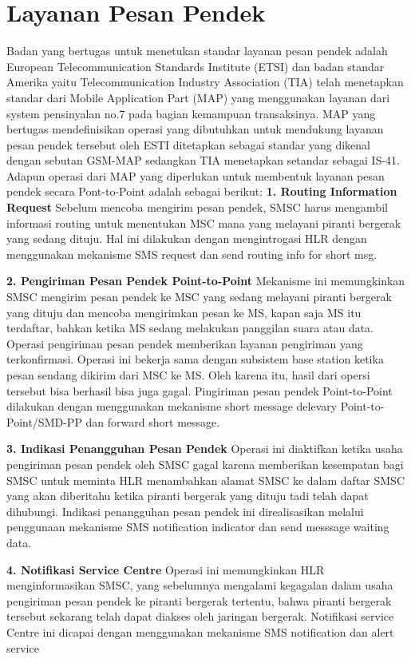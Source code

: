 \documentclass{jtetiproposalskripsi}
\begin{document}
\section{Layanan Pesan Pendek}
Badan yang bertugas untuk menetukan standar layanan pesan pendek adalah European Telecommunication Standards Institute (ETSI) dan badan standar Amerika yaitu Telecommunication Industry Association (TIA) telah menetapkan standar dari Mobile Application Part (MAP) yang menggunakan layanan dari system pensinyalan no.7 pada bagian kemampuan transaksinya. MAP yang bertugas mendefinisikan operasi yang dibutuhkan untuk mendukung layanan pesan pendek tersebut oleh ESTI ditetapkan sebagai standar yang dikenal dengan sebutan GSM-MAP sedangkan TIA menetapkan setandar  sebagai IS-41. Adapun operasi dari MAP yang diperlukan untuk membentuk layanan pesan pendek secara Pont-to-Point adalah sebagai berikut:
\textbf{1.	Routing Information Request}
Sebelum mencoba mengirim pesan pendek, SMSC harus mengambil informasi routing untuk menentukan MSC mana yang melayani piranti bergerak yang sedang dituju. Hal ini dilakukan dengan mengintrogasi HLR dengan menggunakan  mekanisme SMS request dan send routing info for short msg.

\textbf{2.	Pengiriman Pesan Pendek Point-to-Point}
Mekanisme ini memungkinkan SMSC mengirim pesan pendek ke MSC yang sedang melayani piranti bergerak yang dituju dan mencoba mengirimkan pesan ke MS, kapan saja MS itu terdaftar, bahkan ketika MS sedang melakukan panggilan suara atau data. Operasi pengiriman pesan pendek memberikan layanan pengiriman yang terkonfirmasi.
Operasi ini bekerja sama dengan subsistem base station ketika pesan sendang dikirim dari MSC ke MS. Oleh karena itu, hasil dari opersi tersebut bisa berhasil bisa juga gagal. Pingiriman pesan pendek Point-to-Point dilakukan dengan menggunakan mekanisme short message delevary Point-to-Point/SMD-PP dan forward short message.

\textbf{3.	Indikasi Penangguhan Pesan Pendek}
Operasi ini diaktifkan ketika usaha pengiriman pesan pendek oleh SMSC gagal karena memberikan kesempatan bagi SMSC untuk meminta HLR menambahkan alamat SMSC ke dalam daftar SMSC yang akan diberitahu ketika piranti bergerak yang dituju tadi telah dapat dihubungi.
Indikasi penangguhan pesan pendek ini direalisasikan melalui penggunaan mekanisme SMS notification indicator dan send messsage waiting data.

\textbf{4.	Notifikasi Service Centre}
Operasi ini memungkinkan HLR menginformasikan SMSC, yang sebelumnya mengalami kegagalan dalam usaha pengiriman pesan pendek ke piranti bergerak tertentu, bahwa piranti bergerak tersebut sekarang telah dapat diakses oleh jaringan bergerak. Notifikasi service Centre ini dicapai dengan menggunakan mekanisme SMS notification dan alert service
\end{document}

